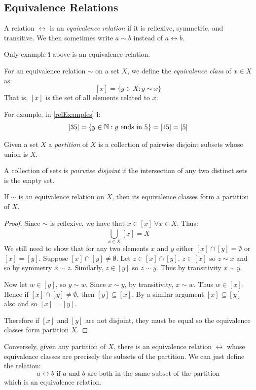 \documentclass[../main.tex]{subfiles}
\begin{document}
\subsection{Equivalence Relations}
\begin{definition}
  A relation $\rel$ is an \textit{equivalence relation} if it is reflexive, symmetric, and transitive.
  We then sometimes write $a \sim b$ instead of $a \rel b$.
\end{definition}
Only example \textbf{i} above is an equivalence relation.
\begin{definition}
  For an equivalence relation $\sim$ on a set $X$, we define the \textit{equivalence class} of $x \in X$ as:
  \[
    [x] = \{y \in X: y \sim x\}
  \]
  That is, $[x]$ is the set of all elements related to $x$.
\end{definition}
\begin{example}
  For example, in \cref{relExamples} \textbf{i}:
  \[
    [35] = \{y \in \mathbb{N} : y \text{ ends in 5}\} = [15] = [5]
  \]
\end{example}
\begin{definition}[Partition]
  Given a set $X$ a \textit{partition} of $X$ is a collection of pairwise disjoint subsets whose union is $X$.
\end{definition}
\begin{definition}
  A collection of sets is \textit{pairwise disjoint} if the intersection of any two distinct sets is the empty set.
\end{definition}
\begin{theorem}
  If $\sim$ is an equivalence relation on $X$, then its equivalence classes form a partition of $X$.
\end{theorem}
\begin{proof}
  Since $\sim$ is reflexive, we have that $x \in [x]\ \forall x \in X$. Thus:
  \[
    \bigcup_{x \in X}^{} [x] = X
  \]
  We still need to show that for any two elements $x$ and $y$ either $[x] \cap [y] = \emptyset$ or $[x] = [y]$.
  Suppose $[x] \cap [y] \neq \emptyset$.
  Let $z \in [x] \cap [y]$.
  $z \in [x]$ so $z \sim x$ and so by symmetry $x \sim z$.
  Similarly, $z \in [y]$ so $z \sim y$.
  Thus by transitivity $x \sim y$.

  Now let $w \in [y]$, so $y \sim w$.
  Since $x \sim y$, by transitivity, $x \sim w$.
  Thus $w \in [x]$.
  Hence if $[x] \cap [y] \neq \emptyset$, then $[y] \subseteq [x]$.
  By a similar argument $[x] \subseteq [y]$ also and so $[x] = [y]$.

  Therefore if $[x]$ and $[y]$ are not disjoint, they must be equal so the equivalence classes form partition $X$.
\end{proof}
Conversely, given any partition of $X$, there is an equivalence relation $\rel$ whose equivalence classes are precisely the subsets of the partition.
We can just define the relation:
\[
  a \rel b \text{ if $a$ and $b$ are both in the same subset of the partition}
\]
which is an equivalence relation.
\end{document}
